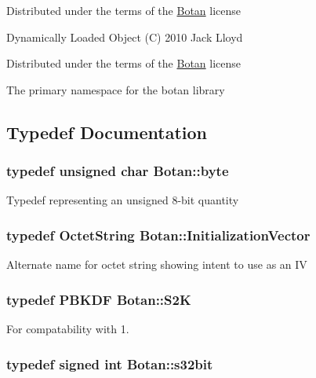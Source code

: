 Distributed under the terms of the \hyperlink{namespaceBotan}{Botan} license

Dynamically Loaded Object (C) 2010 Jack Lloyd

Distributed under the terms of the \hyperlink{namespaceBotan}{Botan} license

The primary namespace for the botan library 

\subsection{Typedef Documentation}
\hypertarget{namespaceBotan_a7d793989d801281df48c6b19616b8b84}{
\subsubsection[{byte}]{\setlength{\rightskip}{0pt plus 5cm}typedef unsigned char {\bf Botan\-::byte}}}\label{namespaceBotan_a7d793989d801281df48c6b19616b8b84}
Typedef representing an unsigned 8-\/bit quantity \hypertarget{namespaceBotan_ab6a07e859c4e3a2ccfd68308ec89497e}{
\subsubsection[{Initialization\-Vector}]{\setlength{\rightskip}{0pt plus 5cm}typedef {\bf Octet\-String} {\bf Botan\-::\-Initialization\-Vector}}}\label{namespaceBotan_ab6a07e859c4e3a2ccfd68308ec89497e}
Alternate name for octet string showing intent to use as an I\-V \hypertarget{namespaceBotan_a5205c90055f402fac271c40e30dd64ba}{
\subsubsection[{S2\-K}]{\setlength{\rightskip}{0pt plus 5cm}typedef {\bf P\-B\-K\-D\-F} {\bf Botan\-::\-S2\-K}}}\label{namespaceBotan_a5205c90055f402fac271c40e30dd64ba}
For compatability with 1. \hypertarget{namespaceBotan_a28e03d327abd4d5b1e7091e8d80d5cfe}{
\subsubsection[{s32bit}]{\setlength{\rightskip}{0pt plus 5cm}typedef signed int {\bf Botan\-::s32bit}}}\label{namespaceBotan_a28e03d327abd4d5b1e7091e8d80d5cfe}
